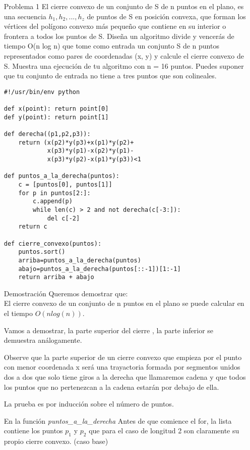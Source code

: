 \documentclass[12pt]{article}
\begin{document}
\begin{itemize}
\item[Problema 1] El cierre convexo de un conjunto de S de n puntos en el plano, es una
secuencia $h_1 , h_2, . . . , h_z$ de puntos de S en posición convexa, que forman
los vértices del polígono convexo más pequeño que contiene en su interior
o frontera a todos los puntos de S. Diseña un algoritmo divide y vencerás
de tiempo O(n log n) que tome como entrada un conjunto S de n puntos
representados como pares de coordenadas (x, y) y calcule el cierre convexo
de S. Muestra una ejecución de tu algoritmo con n = 16 puntos. Puedes suponer que tu conjunto de entrada no tiene a tres puntos que son colineales.
\newpage

\begin{lstlisting}[frame=single]
#!/usr/bin/env python

def x(point): return point[0]
def y(point): return point[1]

def derecha((p1,p2,p3)):
    return (x(p2)*y(p3)+x(p1)*y(p2)+
            x(p3)*y(p1)-x(p2)*y(p1)-
            x(p3)*y(p2)-x(p1)*y(p3))<1

def puntos_a_la_derecha(puntos):
    c = [puntos[0], puntos[1]]
    for p in puntos[2:]:
        c.append(p)
        while len(c) > 2 and not derecha(c[-3:]):
            del c[-2]
    return c

def cierre_convexo(puntos):
    puntos.sort() 
    arriba=puntos_a_la_derecha(puntos)
    abajo=puntos_a_la_derecha(puntos[::-1])[1:-1]
    return arriba + abajo

\end{lstlisting}

\item[Demostración] Queremos demostrar que:\\
 El cierre convexo de un conjunto de n puntos en el plano se puede calcular en el tiempo $O(n  log (n))$.


Vamos a demostrar, la parte superior del cierre , la parte inferior se demuestra análogamente. 

Observe que la parte superior de un cierre convexo que empieza por el punto con menor coordenada x será una trayactoria formada por segmentos unidos dos a dos que solo tiene giros a la derecha que llamaremos cadena y que todos los puntos que no pertenezcan a la cadena estarán por debajo de ella.

La prueba es por inducción sobre el número de puntos. 

En la función \emph{puntos\_a\_la\_derecha}
Antes de que comience el for, la lista contiene los puntos $p_1$ y $p_2$ que para el caso de longitud 2 son claramente su propio cierre convexo. (caso base)\\


\end{itemize}
\end{document}
